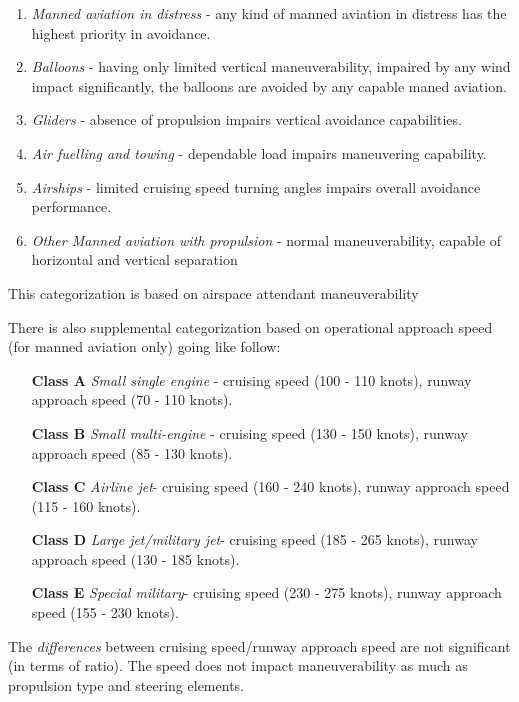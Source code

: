 \begin{enumerate}
    \item \emph{Manned aviation in distress} - any kind of manned aviation in distress has the highest priority in avoidance.
    
    \item \emph{Balloons} - having only limited vertical maneuverability, impaired by any wind impact significantly, the balloons are avoided by any capable maned aviation.
    
    \item \emph{Gliders} - absence of propulsion impairs vertical avoidance capabilities.
    
    \item \emph{Air fuelling and towing} - dependable load impairs maneuvering capability.
    
    \item \emph{Airships} - limited cruising speed turning angles impairs overall avoidance performance.
    
    \item \emph{Other Manned aviation with propulsion} - normal maneuverability, capable of horizontal and vertical separation
\end{enumerate}

\begin{note}
    This categorization is based on airspace attendant maneuverability    
\end{note}

\noindent There is also supplemental categorization based on operational approach speed (for manned aviation only) \cite{doc20068168} going like follow:
\begin{enumerate}
    \item[\textbf{Class A}] \emph{Small single engine} - cruising speed (100 - 110 knots), runway approach speed (70 - 110 knots).
    
    \item[\textbf{Class B}] \emph{Small multi-engine} - cruising speed (130 - 150 knots), runway approach speed (85 - 130 knots).
    
    \item[\textbf{Class C}] \emph{Airline jet}- cruising speed (160 - 240 knots), runway approach speed (115 - 160 knots).
    
    \item[\textbf{Class D}] \emph{Large jet/military jet}- cruising speed (185 - 265 knots), runway approach speed (130 - 185 knots).
    
    \item[\textbf{Class E}] \emph{Special military}- cruising speed (230 - 275 knots), runway approach speed (155 - 230 knots).
\end{enumerate}

\begin{note}
    The \emph{differences} between cruising speed/runway approach speed are not significant (in terms of ratio). The speed does not impact maneuverability as much as propulsion type and steering elements.
\end{note}